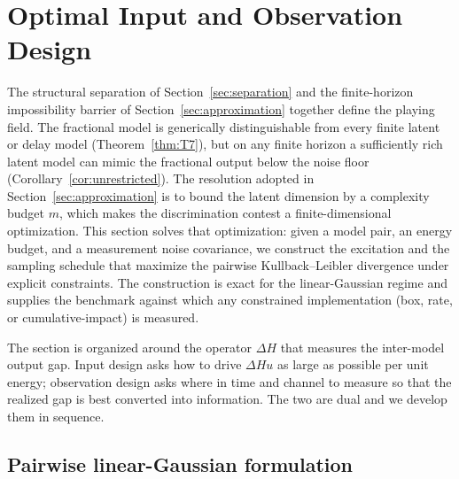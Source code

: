 \section{Optimal Input and Observation Design}
\label{sec:design}

The structural separation of Section~\ref{sec:separation} and the finite-horizon impossibility barrier of Section~\ref{sec:approximation} together define the playing field. The fractional model is generically distinguishable from every finite latent or delay model (Theorem~\ref{thm:T7}), but on any finite horizon a sufficiently rich latent model can mimic the fractional output below the noise floor (Corollary~\ref{cor:unrestricted}). The resolution adopted in Section~\ref{sec:approximation} is to bound the latent dimension by a complexity budget \(m\), which makes the discrimination contest a finite-dimensional optimization. This section solves that optimization: given a model pair, an energy budget, and a measurement noise covariance, we construct the excitation and the sampling schedule that maximize the pairwise Kullback--Leibler divergence under explicit constraints. The construction is exact for the linear-Gaussian regime and supplies the benchmark against which any constrained implementation (box, rate, or cumulative-impact) is measured.

The section is organized around the operator \(\Delta H\) that measures the inter-model output gap. Input design asks how to drive \(\Delta H u\) as large as possible per unit energy; observation design asks where in time and channel to measure so that the realized gap is best converted into information. The two are dual and we develop them in sequence.

\subsection{Pairwise linear-Gaussian formulation}

